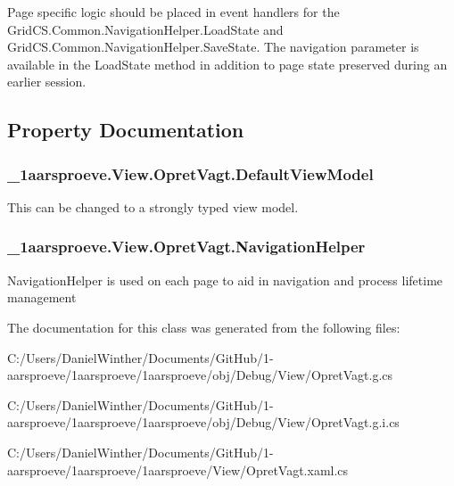 Page specific logic should be placed in event handlers for the Grid\+C\+S.\+Common.\+Navigation\+Helper.\+Load\+State and Grid\+C\+S.\+Common.\+Navigation\+Helper.\+Save\+State. The navigation parameter is available in the Load\+State method in addition to page state preserved during an earlier session. 

\subsection{Property Documentation}
\hypertarget{class__1aarsproeve_1_1_view_1_1_opret_vagt_a917197c5ec9ec6e45bfe1f8be3b5b544}{}
\subsubsection[{Default\+View\+Model}]{ \+\_\+1aarsproeve.\+View.\+Opret\+Vagt.\+Default\+View\+Model\hspace{0.3cm}{\ttfamily [get]}}\label{class__1aarsproeve_1_1_view_1_1_opret_vagt_a917197c5ec9ec6e45bfe1f8be3b5b544}


This can be changed to a strongly typed view model. 

\hypertarget{class__1aarsproeve_1_1_view_1_1_opret_vagt_ac175e006e267cf062167def039b8860c}{}
\subsubsection[{Navigation\+Helper}]{ \+\_\+1aarsproeve.\+View.\+Opret\+Vagt.\+Navigation\+Helper\hspace{0.3cm}{\ttfamily [get]}}\label{class__1aarsproeve_1_1_view_1_1_opret_vagt_ac175e006e267cf062167def039b8860c}


Navigation\+Helper is used on each page to aid in navigation and process lifetime management 



The documentation for this class was generated from the following files\+:\begin{DoxyCompactItemize}
\item 
C\+:/\+Users/\+Daniel\+Winther/\+Documents/\+Git\+Hub/1-\/aarsproeve/1aarsproeve/1aarsproeve/obj/\+Debug/\+View/Opret\+Vagt.\+g.\+cs\item 
C\+:/\+Users/\+Daniel\+Winther/\+Documents/\+Git\+Hub/1-\/aarsproeve/1aarsproeve/1aarsproeve/obj/\+Debug/\+View/Opret\+Vagt.\+g.\+i.\+cs\item 
C\+:/\+Users/\+Daniel\+Winther/\+Documents/\+Git\+Hub/1-\/aarsproeve/1aarsproeve/1aarsproeve/\+View/Opret\+Vagt.\+xaml.\+cs\end{DoxyCompactItemize}

